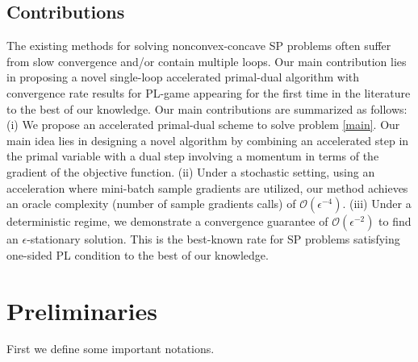 \documentclass[letterpaper,11 pt]{article}
\newcommand{\afj}[1]{{\color{black}#1}}
\begin{document}
\subsection{Contributions}
The existing methods for solving nonconvex-concave SP problems often suffer from slow convergence and/or contain multiple loops. Our main contribution lies in proposing a novel single-loop accelerated primal-dual algorithm with convergence rate results for PL-game appearing for the first time in the literature to the best of our knowledge. 
Our main contributions are summarized as follows:
(i) We propose an accelerated primal-dual scheme to solve problem \eqref{main}. Our main idea lies in designing a novel algorithm by combining an accelerated step in the primal variable with a dual step involving a momentum in terms of the gradient of the objective function. 
(ii) Under a stochastic setting, using an acceleration where mini-batch sample gradients are utilized, our method achieves an oracle complexity (number of sample gradients calls) of $\mathcal O(\epsilon^{-4})$. (iii) Under a deterministic regime,   
    we demonstrate a convergence guarantee of $\mathcal O(\epsilon^{-2})$ to find an $\epsilon$-stationary solution. This is the best-known rate for SP problems satisfying one-sided PL condition to the best of our knowledge. 

\section{Preliminaries}
First we define some important notations. 
\end{document}
